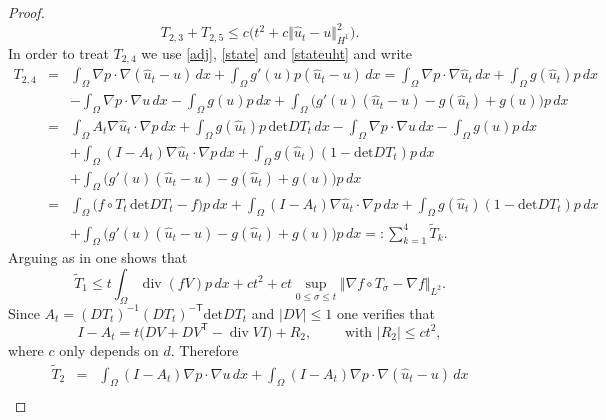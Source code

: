 \documentclass[10pt,a4paper]{amsart}
\DeclareMathOperator{\Div}{div}
\newcommand{\dx}{\,dx}
\begin{document}
\begin{proof}
\begin{equation} \label{eq:t23}
T_{2,3} +T_{2,5}  \leq c \bigl(  t^2 + c \Vert \hat u_t - u \Vert_{H^1}^2 \bigr). 
\end{equation} 
In order to treat $T_{2,4}$ we use  \eqref{adj}, \eqref{state} and \eqref{stateuht} and write
\begin{eqnarray*}
T_{2,4} &=& \int_{\Omega} \nabla p \cdot \nabla ( \hat u_t - u )  \dx + \int_{\Omega} g'(u) p (\hat u_t-u) \dx = \int_{\Omega} \nabla p \cdot \nabla \hat u_t  \dx +  \int_{\Omega}g(\hat u_t)p \dx \\
& & - \int_{\Omega} \nabla p \cdot \nabla u  \dx  - \int_{\Omega}g(u)p \dx 
 + \int_{\Omega} \bigl( g'(u)( \hat u_t -u) - g(\hat u_t) + g(u)) p \dx  \\
 & = & \int_{\Omega} A_t \nabla \hat u_t \cdot \nabla p \dx + \int_{\Omega} g(\hat u_t) p \, 
 \mbox{det} D T_t \dx - \int_{\Omega} \nabla p \cdot \nabla u  \dx  - \int_{\Omega}g(u)p \dx \\
 & & + \int_{\Omega} (I -A_t) \nabla \hat u_t \cdot \nabla p \dx + \int_{\Omega} g(\hat u_t) 
 (1 - \mbox{det} D T_t) p \dx \\
 & & + \int_{\Omega} \bigl( g'(u)( \hat u_t -u) - g(\hat u_t) + g(u)) p \dx  \\
 & = & \int_{\Omega}  \bigl( f \circ T_t \, \mbox{det} D T_t -f \bigr) p \dx
+ \int_{\Omega} (I -  A_t) \nabla \hat u_t \cdot \nabla p \dx + \int_{\Omega} g(\hat u_t) 
 (1 - \mbox{det} D T_t) p \dx \\
 & & + \int_{\Omega} \bigl( g'(u)( \hat u_t -u) - g(\hat u_t) + g(u)) p \dx=: \sum_{k=1}^4 \tilde T_k.
 \end{eqnarray*}
 Arguing as in \cite[(3.14)]{DHH25-convergence} one shows that 
\begin{equation} \label{eq:tildet1} 
\tilde T_1  \leq t \int_{\Omega} \Div( f V) p  \dx +  c t^2 + c t  \sup_{0 \leq \sigma \leq t} \Vert \nabla f \circ T_\sigma - \nabla f \Vert_{L^2}.  
\end{equation}
 Since  $A_t = (DT_t)^{-1} (DT_t)^{-\mathsf{T}} \mbox{det} DT_t$ and $| DV| \leq 1$
 one verifies that
\begin{equation} \label{idmat}
I - A_t = t \bigl( D V + D V^{\mathsf{T}} - \Div V I  \bigr) + R_2, \qquad \mbox{ with } | R_2  | \leq c t^2,
\end{equation}
where $c$ only depends on $d$. Therefore
\begin{eqnarray} 
\tilde T_2 & = & \int_{\Omega} (I- A_t) \nabla p \cdot \nabla u  \dx + \int_{\Omega} (I - A_t) \nabla p \cdot \nabla ( \hat u_t - u)  \dx \nonumber \\

\end{eqnarray}
\end{proof}
\end{document}
